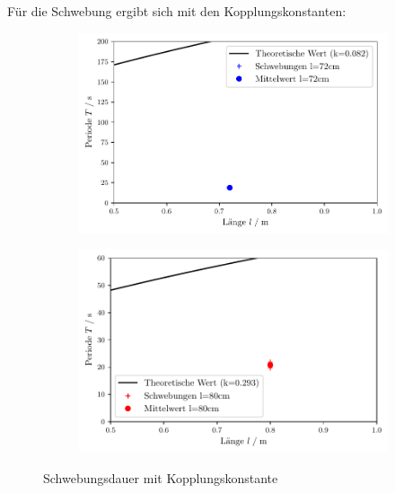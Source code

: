 \newpage
Für die Schwebung ergibt sich mit den Kopplungskonstanten:
\begin{figure}
    \begin{subfigure}[c]{0.5\textwidth}
        \includegraphics[width=\textwidth]{plots/plot6.pdf}
    \end{subfigure}
    \begin{subfigure}[c]{0.5\textwidth}
        \includegraphics[width=\textwidth]{plots/plot7.pdf}
    \end{subfigure}
    \caption{Schwebungsdauer mit Kopplungskonstante}
\end{figure}

